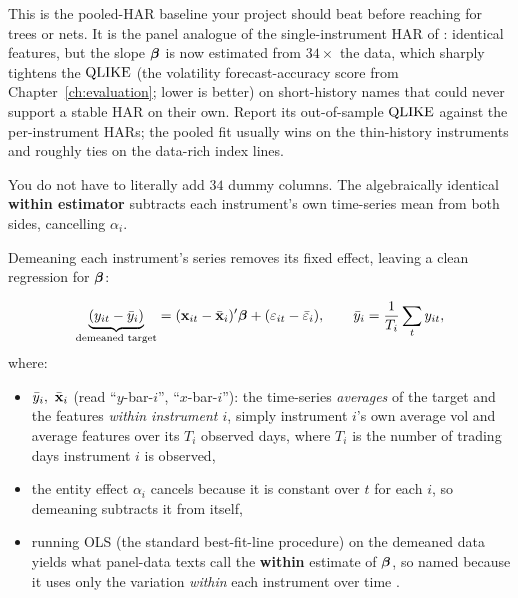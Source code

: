 \begin{projectconnection}
This is the pooled-HAR baseline your project should beat before reaching for
trees or nets.  It is the panel analogue of the single-instrument HAR of
\citet{Corsi2009}: identical features, but the slope $\bm{\beta}$ is now estimated
from $34\times$ the data, which sharply tightens the $\operatorname{QLIKE}$ (the volatility
forecast-accuracy score from Chapter~\ref{ch:evaluation}; lower is better) on
short-history names that could never support a stable HAR on their own.  Report its
out-of-sample $\operatorname{QLIKE}$ against the per-instrument HARs; the pooled fit usually wins on the
thin-history instruments and roughly ties on the data-rich index lines.
\end{projectconnection}

You do not have to literally add $34$ dummy columns.  The algebraically
identical \textbf{within estimator} subtracts each instrument's own time-series
mean from both sides, cancelling $\alpha_i$.

Demeaning each instrument's series removes its fixed effect,
leaving a clean regression for $\bm{\beta}$:

\begin{equation}\label{eq:panel-within}
  \underbrace{(y_{it} - \bar{y}_i)}_{\text{demeaned target}}
  = (\mathbf{x}_{it} - \bar{\mathbf{x}}_i)'\bm{\beta} + (\varepsilon_{it} - \bar{\varepsilon}_i),
  \qquad
  \bar{y}_i = \frac{1}{T_i}\sum_{t} y_{it},
\end{equation}
where:
\begin{itemize}[nosep]
  \item $\bar{y}_i,\ \bar{\mathbf{x}}_i$ (read ``$y$-bar-$i$'', ``$x$-bar-$i$''): the
        time-series \emph{averages} of the target and the features \emph{within
        instrument $i$}, simply instrument $i$'s own average vol and average
        features over its $T_i$ observed days, where $T_i$ is the number of trading
        days instrument $i$ is observed,
  \item the entity effect $\alpha_i$ cancels because it is constant over $t$ for
        each $i$, so demeaning subtracts it from itself,
  \item running OLS (the standard best-fit-line procedure) on the demeaned data
        yields what panel-data texts call the \textbf{within} estimate of $\bm{\beta}$,
        so named because it uses only the variation \emph{within} each
        instrument over time \citep{Wooldridge2010}.
\end{itemize}

